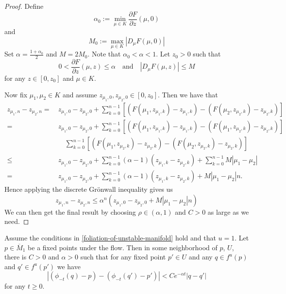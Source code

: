 \begin{proof}
	Define 
	\begin{equation}
		\alpha_0 := \min_{\mu\in K } \frac{\partial F}{\partial z} (\mu, 0) 
	\end{equation} 
	and 
	\begin{equation}
		M_0 := \max_{\mu\in K} \left| D_\mu F (\mu, 0) \right|
	\end{equation}
	Set \(\alpha = \frac{1 + \alpha_0}{2}\) and \(M = 2M_0\). Note that \(\alpha_0 < \alpha < 1\). Let \(z_0 > 0\) such that 
	\begin{equation}
		0 < \frac{\partial F}{\partial z} (\mu, z) \leq \alpha \quad \text{and} \quad \left| D_\mu F (\mu, z) \right| \leq M
	\end{equation}
	for any \(z \in [0,z_0]\) and \(\mu \in K\). 
	
	Now fix \(\mu_1,\mu_2\in K\) and assume \(z_{\mu_1, 0}, z_{\mu_2,0} \in [0,z_0]\). Then we have that 
	\begin{align*}
		z_{\mu_1, n} - z_{\mu_2, n}=\ &z_{\mu_1, 0}- z_{\mu_2, 0} + \sum_{k=0}^{n-1} [(F(\mu_1, z_{\mu_1,k} ) - z_{\mu_1, k}) - (F(\mu_2, z_{\mu_2,k} ) - z_{\mu_2, k})]\\
		=\ &z_{\mu_1, 0}- z_{\mu_2, 0} + \sum_{k=0}^{n-1} [(F(\mu_1, z_{\mu_1,k} ) - z_{\mu_1, k}) - (F(\mu_1, z_{\mu_2,k} ) - z_{\mu_2, k})] \\
		&\quad\sum_{k=0}^{n-1} [(F(\mu_1, z_{\mu_2,k} ) - z_{\mu_2, k}) - (F(\mu_2, z_{\mu_2,k} ) - z_{\mu_2, k})] \\
		\leq\ &z_{\mu_1, 0}- z_{\mu_2, 0} + \sum_{k=0}^{n-1} (\alpha - 1) (z_{\mu_1, k}- z_{\mu_2, k}) +\sum_{k=0}^{n-1} M|\mu_1 - \mu_2| \\
		=\ &z_{\mu_1, 0}- z_{\mu_2, 0} + \sum_{k=0}^{n-1} (\alpha - 1) (z_{\mu_1, k}- z_{\mu_2, k}) +M|\mu_1 - \mu_2| n.
	\end{align*}
	Hence applying the discrete Gr\"onwall inequality gives us
	\begin{equation}
		z_{\mu_1, n} - z_{\mu_2, n} \leq \alpha^n(z_{\mu_1, 0}- z_{\mu_2, 0} + M |\mu_1-\mu_2| n)
	\end{equation}
	We can then get the final result by choosing \(\rho \in (\alpha, 1)\) and \(C>0\) as large as we need.
\end{proof}

\begin{prop}
	Assume the conditions in \cref{foliation-of-unstable-manifold} hold and that \(u = 1\). Let \(p \in \overline{M}_1\) be a fixed points under the flow. Then in some neighborhood of \(p\), \(U\), there is \(C> 0 \) and \(\alpha > 0\) such that for any fixed point \(p'\in U\) and any \(q \in f^u(p)\) and \(q'\in f^u(p')\) we have
	\begin{equation}
		|(\phi_{-t}(q) - p) - (\phi_{-t}(q') - p')| < C e^{-\alpha t} | q - q'|
	\end{equation}
	for any \(t\geq 0.\)
\end{prop}

